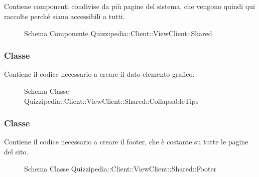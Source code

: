 \subsection{}
Contiene componenti condivise da più pagine del sistema, che vengono quindi qui raccolte perché siano accessibili a tutti.
\begin{figure}[H]
\centering
\noindent{}
\caption[Schema Componente Quizzipedia::Client::ViewClient::Shared]{Schema Componente Quizzipedia::Client::ViewClient::Shared}
\end{figure}
\subsubsection{Classe }
Contiene il codice necessario a creare il dato elemento grafico.
\begin{figure}[H]
\centering
\noindent{}
\caption[Schema Classe CollapsableTips]{Schema Classe Quizzipedia::Client::ViewClient::Shared::CollapsableTips}
\end{figure}
\subsubsection{Classe }
Contiene il codice necessario a creare il footer, che è costante su tutte le pagine del sito.
\begin{figure}[H]
\centering
\noindent{}
\caption[Schema Classe Footer]{Schema Classe Quizzipedia::Client::ViewClient::Shared::Footer}
\end{figure}
